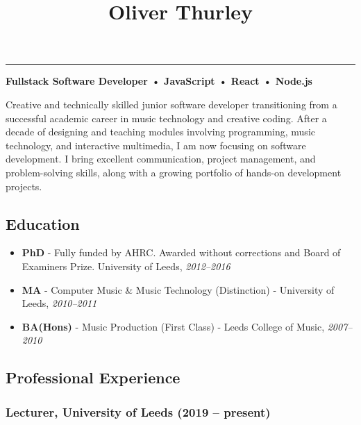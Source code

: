 \documentclass[10pt,a4paper]{article}
\title{{\huge Oliver Thurley}{\raggedright}}
\author{}
\date{}
\makeatletter
\renewcommand{\maketitle}{\bgroup\setlength{\parindent}{0pt}
\begin{flushleft}
  \normalfont{\@title}
  \@author
\end{flushleft}\egroup
}
\providecommand{\tightlist}{%
  \setlength{\itemsep}{0pt}\setlength{\parskip}{0pt}}
\makeatother
\begin{document}
\maketitle

\vspace{0.5em}
\noindent\href{mailto:o.thrly@gmail.com}{} \hfill
{} \hfill
\href{https://github.com/thrly}{} \hfill
\href{https://linkedin.com/in/oliver-thurley}{}

\vspace{0.75em}
\noindent\rule{\textwidth}{0.5pt}

\textbf{Fullstack Software Developer • JavaScript • React • Node.js}

Creative and technically skilled junior software developer transitioning
from a successful academic career in music technology and creative
coding. After a decade of designing and teaching modules involving
programming, music technology, and interactive multimedia, I am now
focusing on software development. I bring excellent communication,
project management, and problem-solving skills, along with a growing
portfolio of hands-on development projects.

\subsection{Education}\label{education}

\begin{itemize}
\tightlist
\item
  \textbf{PhD} - Fully funded by AHRC. Awarded without corrections and
  Board of Examiners Prize. University of Leeds, \emph{2012--2016}
\item
  \textbf{MA} - Computer Music \& Music Technology (Distinction) -
  University of Leeds, \emph{2010--2011}
\item
  \textbf{BA(Hons)} - Music Production (First Class) - Leeds College of
  Music, \emph{2007--2010}
\end{itemize}

\subsection{Professional Experience}\label{professional-experience}

\subsubsection{Lecturer, University of Leeds (2019 --
present)}\label{lecturer-university-of-leeds-2019-present}
\end{document}
